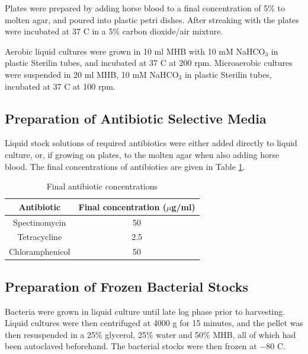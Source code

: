 Plates were prepared by adding horse blood to a final concentration of 5\% to molten agar, and poured into plastic petri dishes. After streaking with \Nm{} the plates were incubated at 37 \textdegree C in a 5\% carbon dioxide/air mixture.

Aerobic liquid cultures were grown in 10 ml MHB with 10 mM NaHCO$_\textrm{3}$ in plastic Sterilin tubes, and incubated at 37 \textdegree C at 200 rpm. Microaerobic cultures were suspended in 20 ml MHB, 10 mM NaHCO$_\textrm{3}$ in plastic Sterilin tubes, incubated at 37 \textdegree C at 100 rpm.

\subsection{Preparation of Antibiotic Selective Media}
Liquid stock solutions of required antibiotics were either added directly to liquid culture, or, if growing on plates, to the molten agar when also adding horse blood. The final concentrations of antibiotics are given in Table \ref{tab:antibiotic-concs}.

\begin{table}[here]
\begin{center}
\begin{tabular}{cc}
\toprule
\textbf{Antibiotic} & \textbf{Final concentration ($\mu$g/ml)} \\
\midrule
Spectinomycin & 50 \\
Tetracycline & 2.5 \\
Chloramphenicol & 50 \\
\bottomrule
\end{tabular} 
\end{center}
\caption{Final antibiotic concentrations
\label{tab:antibiotic-concs}}
\end{table}

\subsection{Preparation of Frozen Bacterial Stocks}
Bacteria were grown in liquid culture until late log phase prior to harvesting. Liquid cultures were then centrifuged at 4000 g for 15 minutes, and the pellet was then resuspended in a 25\% glycerol, 25\% water and 50\% MHB, all of which had been autoclaved beforehand. The bacterial stocks were then frozen at $-80$ \textdegree C.


